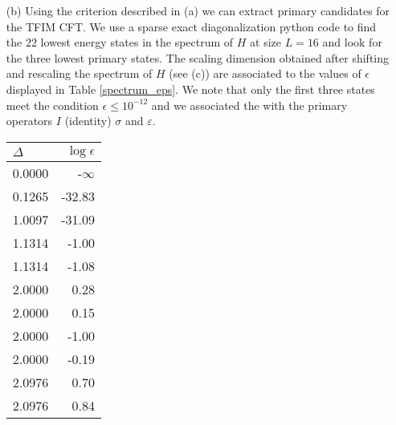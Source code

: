 \documentclass[10pt, a4paper]{article}
\begin{document}
{\begin{enumerate}
  In the finite size spectrum of $H$, the approximate primaries can be found by numerically computing the norm $\epsilon^{(n)}_\varphi \equiv |\Gamma_{\varphi} O_n\ket{\varphi}|$. This norm is zero in the limit $L\to \infty$ iff we have a primary state. For finite $L$, we relax the zero norm condition to a small norm condition. More precisely, we introduce a threshold $\epsilon_{\rm max}$ and declare an eigenstate of $H$ "primary candidate" iff $\epsilon \equiv \epsilon^{(1)}_\varphi + \epsilon^{(2)}_\varphi \leq \epsilon_{\rm max}$. 
  \item[(b)] Using the criterion described in (a) we can extract primary candidates for the TFIM CFT. We use a sparse exact diagonalization python code to find the $22$ lowest energy states in the spectrum of $H$ at size $L = 16$ and look for the three lowest primary states. The scaling dimension obtained after shifting and rescaling the spectrum of $H$ (see (c)) are associated to the values of $\epsilon$ displayed in Table \ref{spectrum_eps}. We note that only the first three states meet the condition $\epsilon \leq 10^{-12}$ and we associated the with the primary operators $I$ (identity) $\sigma$ and $\varepsilon$. 
  \begin{table}
    \centering
        \begin{minipage}{.5\linewidth}
          \flushright
          \begin{tabular}{lr}
            \toprule
            $\Delta$ & $\log \epsilon$ \\
            \midrule
            0.0000 & -$\infty$\\
            0.1265 & -32.83 \\
            1.0097 & -31.09 \\
            1.1314 & -1.00 \\
            1.1314 & -1.08 \\
            2.0000 & 0.28 \\
            2.0000 & 0.15 \\
            2.0000 & -1.00 \\
            2.0000 & -0.19 \\
            2.0976 & 0.70 \\
            2.0976 & 0.84 \\
            \bottomrule
            \end{tabular}
        \end{minipage}%
        \begin{minipage}{.5\linewidth}
          \flushleft
          \begin{tabular}{lr}

\end{tabular}
\end{minipage}
\end{table}
\end{enumerate}}
\end{document}
